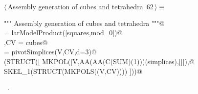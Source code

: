 \documentclass[11pt,oneside]{article}	%
\begin{document}
\begin{flushleft} \small \label{scrap121}
\protect{}$\langle\,$Assembly generation of cubes and tetrahedra\nobreak\ {\footnotesize 62}$\,\rangle\equiv$
\vspace{-1ex}
\begin{list}{}{} \item
\mbox{}\verb@""" Assembly generation  of cubes and tetrahedra """@\\
\mbox{}\verb@cubes = larModelProduct([squares,mod_0])@\\
\mbox{}\verb@V,CV = cubes@\\
\mbox{}\verb@simplices = pivotSimplices(V,CV,d=3)@\\
\mbox{}\verb@VIEW(STRUCT([ MKPOL([V,AA(AA(C(SUM)(1)))(simplices),[]]),@\\
\mbox{}\verb@           SKEL_1(STRUCT(MKPOLS((V,CV)))) ]))@\\
\mbox{}\verb@@{\NWsep}
\end{list}
\vspace{-1ex}
\footnotesize\addtolength{\baselineskip}{-1ex}
\begin{list}{}{\setlength{\itemsep}{-\parsep}\setlength{\itemindent}{-\leftmargin}}
\item \NWtxtMacroRefIn\ .
\end{list}
\end{flushleft}









\end{document}
